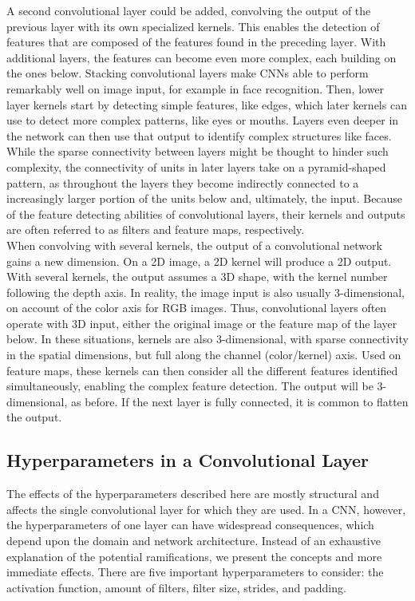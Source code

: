 \noindent A second convolutional layer could be added, convolving the output of the previous layer with its own specialized kernels. This enables the detection of features that are composed of the features found in the preceding layer. With additional layers, the features can become even more complex, each building on the ones below. Stacking convolutional layers make CNNs able to perform remarkably well on image input, for example in face recognition. Then, lower layer kernels start by detecting simple features, like edges, which later kernels can use to detect more complex patterns, like eyes or mouths. Layers even deeper in the network can then use that output to identify complex structures like faces. While the sparse connectivity between layers might be thought to hinder such complexity, the connectivity of units in later layers take on a pyramid-shaped pattern, as throughout the layers they become indirectly connected to a increasingly larger portion of the units below and, ultimately, the input. Because of the feature detecting abilities of convolutional layers, their kernels and outputs are often referred to as filters and feature maps, respectively. \\

\noindent When convolving with several kernels, the output of a convolutional network gains a new dimension. On a 2D image, a 2D kernel will produce a 2D output. With several kernels, the output assumes a 3D shape, with the kernel number following the depth axis. In reality, the image input is also usually 3-dimensional, on account of the color axis for RGB images. Thus, convolutional layers often operate with 3D input, either the original image or the feature map of the layer below. In these situations, kernels are also 3-dimensional, with sparse connectivity in the spatial dimensions, but full along the channel (color/kernel) axis. Used on feature maps, these kernels can then consider all the different features identified simultaneously, enabling the complex feature detection. The output will be 3-dimensional, as before. If the next layer is fully connected, it is common to flatten the output.

\subsection{Hyperparameters in a Convolutional Layer}

The effects of the hyperparameters described here are mostly structural and affects the single convolutional layer for which they are used. In a CNN, however, the hyperparameters of one layer can have widespread consequences, which depend upon the domain and network architecture. Instead of an exhaustive explanation of the potential ramifications, we present the concepts and more immediate effects. There are five important hyperparameters to consider: the activation function, amount of filters, filter size, strides, and padding. 

